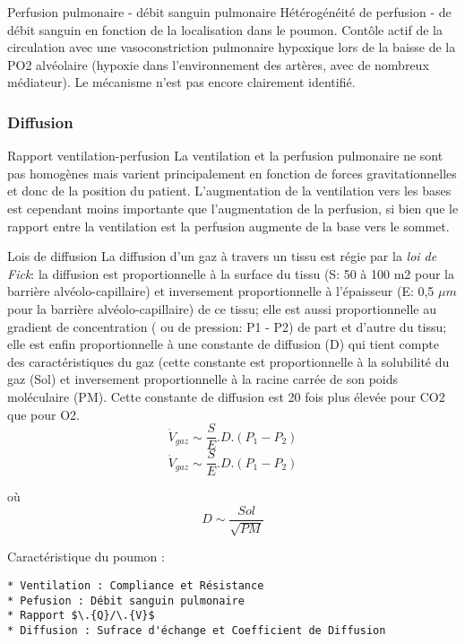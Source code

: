 \documentclass[12pt,]{article}
\begin{document}
Perfusion pulmonaire - débit sanguin pulmonaire Hétérogénéité de
perfusion - de débit sanguin en fonction de la localisation dans le
poumon. Contôle actif de la circulation avec une vasoconstriction
pulmonaire hypoxique lors de la baisse de la PO2 alvéolaire (hypoxie
dans l'environnement des artères, avec de nombreux médiateur). Le
mécanisme n'est pas encore clairement identifié.

\hypertarget{diffusion}{%
\subsubsection{Diffusion}\label{diffusion}}

Rapport ventilation-perfusion La ventilation et la perfusion pulmonaire
ne sont pas homogènes mais varient principalement en fonction de forces
gravitationnelles et donc de la position du patient. L'augmentation de
la ventilation vers les bases est cependant moins importante que
l'augmentation de la perfusion, si bien que le rapport entre la
ventilation est la perfusion augmente de la base vers le sommet.

Lois de diffusion La diffusion d'un gaz à travers un tissu est régie par
la \emph{loi de Fick}: la diffusion est proportionnelle à la surface du
tissu (S: 50 à 100 m2 pour la barrière alvéolo-capillaire) et
inversement proportionnelle à l'épaisseur (E: 0,5 \(\mu m\) pour la
barrière alvéolo-capillaire) de ce tissu; elle est aussi proportionnelle
au gradient de concentration ( ou de pression: P1 - P2) de part et
d'autre du tissu; elle est enfin proportionnelle à une constante de
diffusion (D) qui tient compte des caractéristiques du gaz (cette
constante est proportionnelle à la solubilité du gaz (Sol) et
inversement proportionnelle à la racine carrée de son poids moléculaire
(PM). Cette constante de diffusion est 20 fois plus élevée pour CO2 que
pour O2. \[ \dot{V}_{gaz} \sim \frac{S}{E}.D.(P_{1}-P_{2})\]
\begin{equation}
  \dot{V}_{gaz} \sim \frac{S}{E}.D.(P_{1}-P_{2})
\label{eq:Loi de Fick}
\end{equation}

où \[ D \sim \frac{Sol}{\sqrt{PM}}\]

Caractéristique du poumon :

\begin{verbatim}
* Ventilation : Compliance et Résistance
* Pefusion : Débit sanguin pulmonaire
* Rapport $\.{Q}/\.{V}$
* Diffusion : Sufrace d'échange et Coefficient de Diffusion
\end{verbatim}
\end{document}
